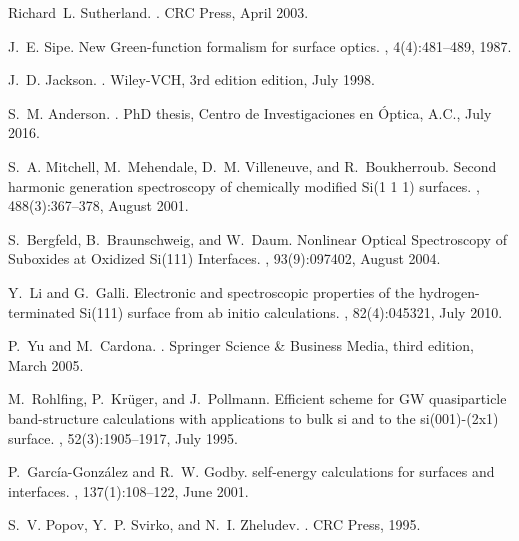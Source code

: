 \documentclass[aps,prb,10pt,showpacs,letterpaper,twocolumn]{revtex4-1}
\begin{document}
\begin{thebibliography}{10}
Richard~L. Sutherland.
.
\newblock CRC Press, April 2003.

J.~E. Sipe.
\newblock New {Green}-function formalism for surface optics.
, 4(4):481--489,
  1987.

J.~D. Jackson.
.
\newblock Wiley-VCH, 3rd edition edition, July 1998.

S.~M. Anderson.
.
\newblock PhD thesis, Centro de Investigaciones en \'Optica, A.C., July 2016.

S.~A. Mitchell, M.~Mehendale, D.~M. Villeneuve, and R.~Boukherroub.
\newblock Second harmonic generation spectroscopy of chemically modified {Si}(1
  1 1) surfaces.
, 488(3):367--378, August 2001.

S.~Bergfeld, B.~Braunschweig, and W.~Daum.
\newblock Nonlinear {Optical} {Spectroscopy} of {Suboxides} at {Oxidized}
  {Si}(111) {Interfaces}.
, 93(9):097402, August 2004.

Y.~Li and G.~Galli.
\newblock Electronic and spectroscopic properties of the hydrogen-terminated
  {Si}(111) surface from ab initio calculations.
, 82(4):045321, July 2010.

P.~Yu and M.~Cardona.
.
\newblock Springer Science \& Business Media, third edition, March 2005.

M.~Rohlfing, P.~Kr{\"u}ger, and J.~Pollmann.
\newblock Efficient scheme for {GW} quasiparticle band-structure calculations
  with applications to bulk si and to the si(001)-(2x1) surface.
, 52(3):1905--1917, July 1995.

P.~Garc{\'i}a-Gonz{\'a}lez and R.~W. Godby.
 self-energy calculations for surfaces and interfaces.
, 137(1):108--122, June 2001.

S.~V. Popov, Y.~P. Svirko, and N.~I. Zheludev.
.
\newblock CRC Press, 1995.

\end{thebibliography}
\end{document}
